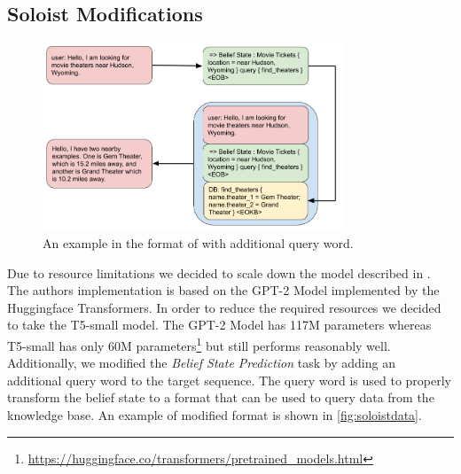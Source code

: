 \documentclass[twocolumn]{tum-article}
\begin{document}
\subsection{Soloist Modifications}
\label{sec:soloist_mod}
\begin{figure}[!h]
\centering
\includegraphics[width=0.8\textwidth]{figures/Soloist_Data.png}
\caption{An example in the format of \cite{peng2020soloist} with additional query word.}
\label{fig:soloistdata}
\end{figure}
Due to resource limitations we decided to scale down the model described in \cite{peng2020soloist}. The authors implementation is based on the GPT-2 Model\cite{radford2019language} implemented by the Huggingface Transformers\cite{wolf2019huggingface}. In order to reduce the required resources we decided to take the T5-small\cite{raffel2019exploring} model. The GPT-2 Model has 117M parameters whereas T5-small has only 60M parameters\footnote{\url{https://huggingface.co/transformers/pretrained_models.html}} but still performs reasonably well.
Additionally, we modified the \textit{Belief State Prediction} task by adding an additional query word to the target sequence. The query word is used to properly transform the belief state to a format that can be used to query data from the knowledge base. An example of modified format is shown in \autoref{fig:soloistdata}. 
\end{document}
